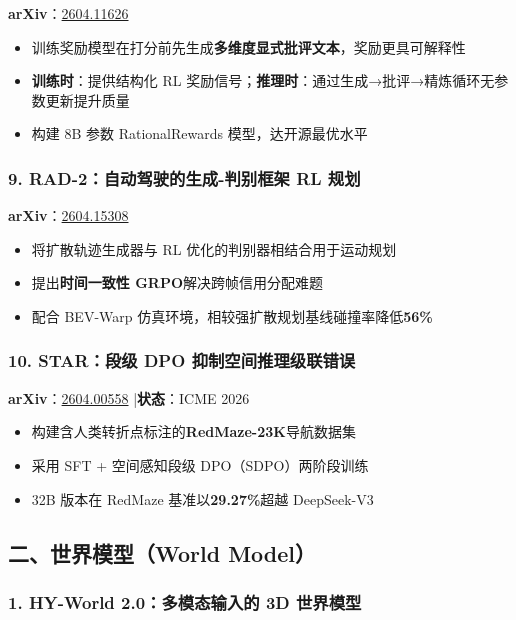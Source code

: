 \textbf{arXiv}：\href{https://arxiv.org/abs/2604.11626}{2604.11626}

\begin{itemize}[leftmargin=1.5em]
  \item 训练奖励模型在打分前先生成\textbf{多维度显式批评文本}，奖励更具可解释性
  \item \textbf{训练时}：提供结构化 RL 奖励信号；\textbf{推理时}：通过生成→批评→精炼循环无参数更新提升质量
  \item 构建 8B 参数 RationalRewards 模型，达开源最优水平
\end{itemize}

\subsubsection{9. RAD-2：自动驾驶的生成-判别框架 RL 规划}

\textbf{arXiv}：\href{https://arxiv.org/abs/2604.15308}{2604.15308}

\begin{itemize}[leftmargin=1.5em]
  \item 将扩散轨迹生成器与 RL 优化的判别器相结合用于运动规划
  \item 提出\textbf{时间一致性 GRPO}解决跨帧信用分配难题
  \item 配合 BEV-Warp 仿真环境，相较强扩散规划基线碰撞率降低\textbf{56\%}
\end{itemize}

\subsubsection{10. STAR：段级 DPO 抑制空间推理级联错误}

\textbf{arXiv}：\href{https://arxiv.org/abs/2604.00558}{2604.00558} |\textbf{状态}：ICME 2026

\begin{itemize}[leftmargin=1.5em]
  \item 构建含人类转折点标注的\textbf{RedMaze-23K}导航数据集
  \item 采用 SFT + 空间感知段级 DPO（SDPO）两阶段训练
  \item 32B 版本在 RedMaze 基准以\textbf{29.27\%}超越 DeepSeek-V3
\end{itemize}

\subsection{二、世界模型（World Model）}

\subsubsection{1. HY-World 2.0：多模态输入的 3D 世界模型}


